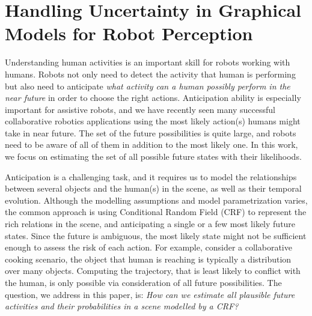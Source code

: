 

\section{Handling Uncertainty in Graphical Models for Robot Perception}
\label{intro}
Understanding  human activities is an important skill for robots working with humans. Robots not only need to detect the activity that human is performing but also need to anticipate \emph{what activity can a human possibly perform in the near future} in order to choose the right actions. Anticipation ability is especially important for assistive robots, and we have recently seen many successful collaborative robotics applications \cite{collob1,collob2,hemaISER} using the most likely action(s) humans might take in near future.
The set of the future possibilities is quite large, and robots need to be aware of all of them in addition to the most likely one. In this work, we focus on estimating the set of all possible future states with their likelihoods.


Anticipation is a challenging task, and it requires us to model the relationships between several objects and the human(s) in the scene, as well as their temporal evolution. Although the modelling assumptions and model parametrization varies, the common approach \cite{hemaAnt,gpcrf,hemaECCV,tian} is using Conditional Random Field (CRF) to represent the rich relations in the scene, and anticipating a single or a few most likely future states. Since the future is ambiguous, the most likely state might not be sufficient enough to assess the risk of each action. For example, consider a collaborative cooking scenario, the object that human is reaching is typically a distribution over many objects. Computing the trajectory, that is least likely to conflict with the human, is only possible via consideration of all future possibilities. The question, we address in this paper, is: \emph{How can we estimate all plausible future activities and their probabilities in a scene modelled by a CRF?}



